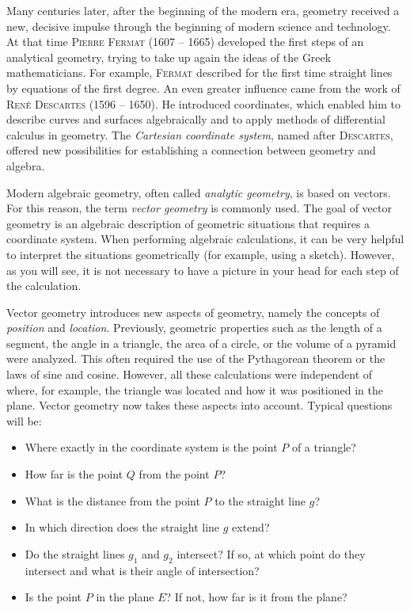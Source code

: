 \documentclass[12pt,eng]{skript_ogg}
\begin{document}
Many centuries later, after the beginning of the modern era, geometry received a new, decisive impulse through the beginning of modern science and technology. At that time \textsc{Pierre Fermat} (1607 -- 1665) developed the first steps of an analytical geometry, trying to take up again the ideas of the Greek mathematicians. For example, \textsc{Fermat} described for the first time straight lines by equations of the first degree. An even greater influence came from the work of \textsc{Ren\'e Descartes} (1596 -- 1650). He introduced coordinates, which enabled him to describe curves and surfaces algebraically and to apply methods of differential calculus in geometry. The \emph{Cartesian coordinate system}, named after \textsc{Descartes}, offered new possibilities for establishing a connection between geometry and algebra.

Modern algebraic geometry, often called \emph{analytic geometry}, is based on vectors. For this reason, the term \emph{vector geometry} is commonly used. The goal of vector geometry is an algebraic description of geometric situations that requires a coordinate system. When performing algebraic calculations, it can be very helpful to interpret the situations geometrically (for example, using a sketch). However, as you will see, it is not necessary to have a picture in your head for each step of the calculation.

Vector geometry introduces new aspects of geometry, namely the concepts of \emph{position} and \emph{location}. Previously, geometric properties such as the length of a segment, the angle in a triangle, the area of a circle, or the volume of a pyramid were analyzed. This often required the use of the Pythagorean theorem or the laws of sine and cosine. However, all these calculations were independent of where, for example, the triangle was located and how it was positioned in the plane. Vector geometry now takes these aspects into account. Typical questions will be:
\begin{itemize}
	\item Where exactly in the coordinate system is the point $P$ of a triangle?
	\item How far is the point $Q$ from the point $P$?
	\item What is the distance from the point $P$ to the straight line $g$?
	\item In which direction does the straight line $g$ extend?
	\item Do the straight lines $g_1$ and $g_2$ intersect? If so, at which point do they intersect and what is their angle of intersection?
	\item Is the point $P$ in the plane $E$? If not, how far is it from the plane?
\end{itemize}
\end{document}
